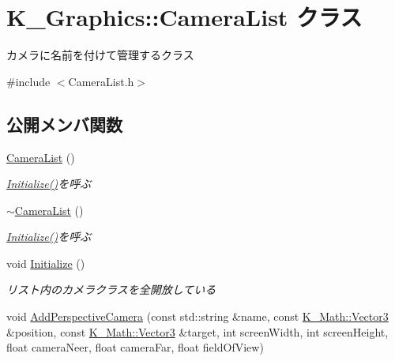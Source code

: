 \hypertarget{class_k___graphics_1_1_camera_list}{}\section{K\+\_\+\+Graphics\+:\+:Camera\+List クラス}
\label{class_k___graphics_1_1_camera_list}


カメラに名前を付けて管理するクラス  




{\ttfamily \#include $<$Camera\+List.\+h$>$}

\subsection*{公開メンバ関数}
\begin{DoxyCompactItemize}
\item 
\mbox{\hyperlink{class_k___graphics_1_1_camera_list_a83eea14d2963da7f46309fc06675da86}{Camera\+List}} ()
\begin{DoxyCompactList}\small\item\em \mbox{\hyperlink{class_k___graphics_1_1_camera_list_a933c12ada5504b803d7ad91f38a709fc}{Initialize()}}を呼ぶ \end{DoxyCompactList}\item 
\mbox{\hyperlink{class_k___graphics_1_1_camera_list_a6bd62a622ec57ba1bfd3266213024f4b}{$\sim$\+Camera\+List}} ()
\begin{DoxyCompactList}\small\item\em \mbox{\hyperlink{class_k___graphics_1_1_camera_list_a933c12ada5504b803d7ad91f38a709fc}{Initialize()}}を呼ぶ \end{DoxyCompactList}\item 
void \mbox{\hyperlink{class_k___graphics_1_1_camera_list_a933c12ada5504b803d7ad91f38a709fc}{Initialize}} ()
\begin{DoxyCompactList}\small\item\em リスト内のカメラクラスを全開放している \end{DoxyCompactList}\item 
void \mbox{\hyperlink{class_k___graphics_1_1_camera_list_a2cb2f2ae77ead81009a8e1677617a4a8}{Add\+Perspective\+Camera}} (const std\+::string \&name, const \mbox{\hyperlink{namespace_k___math_a66884d78082c39ada4091c211f3570f8}{K\+\_\+\+Math\+::\+Vector3}} \&position, const \mbox{\hyperlink{namespace_k___math_a66884d78082c39ada4091c211f3570f8}{K\+\_\+\+Math\+::\+Vector3}} \&target, int screen\+Width, int screen\+Height, float camera\+Neer, float camera\+Far, float field\+Of\+View)

\end{DoxyCompactItemize}
